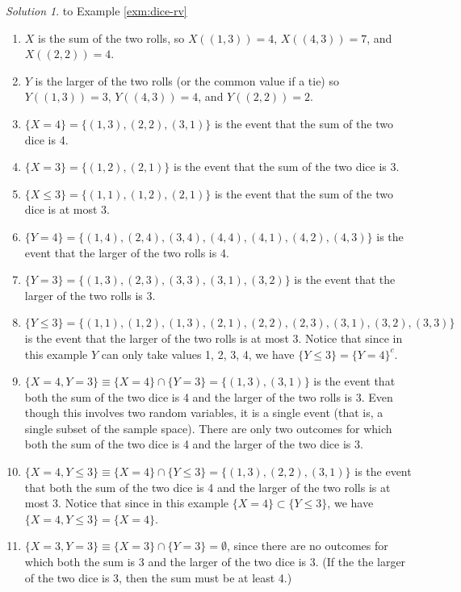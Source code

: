 \documentclass[
]{book}
\providecommand{\tightlist}{%
  \setlength{\itemsep}{0pt}\setlength{\parskip}{0pt}}
\theoremstyle{definition}
\theoremstyle{definition}
\theoremstyle{definition}
\theoremstyle{remark}
\newtheorem*{solution}{Solution}
\begin{document}
\begin{solution}
{}to Example \ref{exm:dice-rv}
\end{solution}

\begin{enumerate}
\def\labelenumi{\arabic{enumi}.}
\tightlist
\item
  \(X\) is the sum of the two rolls, so \(X((1, 3))=4\), \(X((4, 3))=7\), and \(X((2,2))=4\).
\item
  \(Y\) is the larger of the two rolls (or the common value if a tie) so \(Y((1, 3))=3\), \(Y((4, 3))=4\), and \(Y((2,2))=2\).
\item
  \(\{X = 4\} =\{(1, 3), (2, 2), (3, 1)\}\) is the event that the sum of the two dice is 4.
\item
  \(\{X = 3\} =\{(1, 2), (2, 1)\}\) is the event that the sum of the two dice is 3.
\item
  \(\{X \le 3\}=\{(1, 1), (1, 2), (2, 1)\}\) is the event that the sum of the two dice is at most 3.
\item
  \(\{Y = 4\}=\{(1, 4), (2, 4), (3, 4), (4, 4), (4, 1), (4, 2), (4,3)\}\) is the event that the larger of the two rolls is 4.
\item
  \(\{Y = 3\}=\{(1, 3), (2, 3), (3, 3), (3, 1), (3, 2)\}\) is the event that the larger of the two rolls is 3.
\item
  \(\{Y \le 3\}=\{(1, 1), (1, 2), (1, 3), (2, 1), (2, 2), (2, 3), (3, 1), (3, 2), (3, 3)\}\) is the event that the larger of the two rolls is at most 3. Notice that since in this example \(Y\) can only take values 1, 2, 3, 4, we have \(\{Y\le 3\} = \{Y=4\}^c\).
\item
  \(\{X = 4, Y = 3\} \equiv \{X = 4\}\cap \{Y = 3\}=\{(1, 3), (3, 1)\}\) is the event that both the sum of the two dice is 4 and the larger of the two rolls is 3. Even though this involves two random variables, it is a single event (that is, a single subset of the sample space). There are only two outcomes for which both the sum of the two dice is 4 and the larger of the two dice is 3.
\item
  \(\{X = 4, Y \le 3\} \equiv \{X = 4\}\cap \{Y \le 3\}=\{(1, 3), (2, 2), (3, 1)\}\) is the event that both the sum of the two dice is 4 and the larger of the two rolls is at most 3. Notice that since in this example \(\{X=4\} \subset \{Y\le 3\}\), we have \(\{X = 4, Y \le 3\} = \{X=4\}\).
\item
  \(\{X = 3, Y = 3\} \equiv \{X = 3\}\cap \{Y = 3\}=\emptyset\), since there are no outcomes for which both the sum is 3 and the larger of the two dice is 3. (If the the larger of the two dice is 3, then the sum must be at least 4.)

\end{enumerate}
\end{document}
